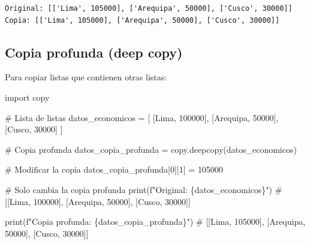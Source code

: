 \documentclass[
  doc,
  floatsintext,
  longtable,
  a4paper,
  nolmodern,
  notxfonts,
  notimes,
  12pt,
  colorlinks=true,linkcolor=blue,citecolor=blue,urlcolor=blue]{apa7}
\newenvironment{Shaded}{\begin{snugshade}}{\end{snugshade}}
\newcommand{\BuiltInTok}[1]{\textcolor[rgb]{0.00,0.23,0.31}{#1}}
\newcommand{\CommentTok}[1]{\textcolor[rgb]{0.37,0.37,0.37}{#1}}
\newcommand{\DecValTok}[1]{\textcolor[rgb]{0.68,0.00,0.00}{#1}}
\newcommand{\ImportTok}[1]{\textcolor[rgb]{0.00,0.46,0.62}{#1}}
\newcommand{\NormalTok}[1]{\textcolor[rgb]{0.00,0.23,0.31}{#1}}
\newcommand{\OperatorTok}[1]{\textcolor[rgb]{0.37,0.37,0.37}{#1}}
\newcommand{\SpecialCharTok}[1]{\textcolor[rgb]{0.37,0.37,0.37}{#1}}
\newcommand{\SpecialStringTok}[1]{\textcolor[rgb]{0.13,0.47,0.30}{#1}}
\newcommand{\StringTok}[1]{\textcolor[rgb]{0.13,0.47,0.30}{#1}}
\begin{document}
\begin{verbatim}
Original: [['Lima', 105000], ['Arequipa', 50000], ['Cusco', 30000]]
Copia: [['Lima', 105000], ['Arequipa', 50000], ['Cusco', 30000]]
\end{verbatim}

\subsection{Copia profunda (deep copy)}\label{copia-profunda-deep-copy}

Para copiar listas que contienen otras listas:

\begin{Shaded}
\begin{Highlighting}[]
\ImportTok{import}\NormalTok{ copy}

\CommentTok{\# Lista de listas}
\NormalTok{datos\_economicos }\OperatorTok{=}\NormalTok{ [}
\NormalTok{    [}\StringTok{\textquotesingle{}Lima\textquotesingle{}}\NormalTok{, }\DecValTok{100000}\NormalTok{],}
\NormalTok{    [}\StringTok{\textquotesingle{}Arequipa\textquotesingle{}}\NormalTok{, }\DecValTok{50000}\NormalTok{],}
\NormalTok{    [}\StringTok{\textquotesingle{}Cusco\textquotesingle{}}\NormalTok{, }\DecValTok{30000}\NormalTok{]}
\NormalTok{]}

\CommentTok{\# Copia profunda}
\NormalTok{datos\_copia\_profunda }\OperatorTok{=}\NormalTok{ copy.deepcopy(datos\_economicos)}

\CommentTok{\# Modificar la copia}
\NormalTok{datos\_copia\_profunda[}\DecValTok{0}\NormalTok{][}\DecValTok{1}\NormalTok{] }\OperatorTok{=} \DecValTok{105000}

\CommentTok{\# Solo cambia la copia profunda}
\BuiltInTok{print}\NormalTok{(}\SpecialStringTok{f"Original: }\SpecialCharTok{\{}\NormalTok{datos\_economicos}\SpecialCharTok{\}}\SpecialStringTok{"}\NormalTok{)}
\CommentTok{\# [[\textquotesingle{}Lima\textquotesingle{}, 100000], [\textquotesingle{}Arequipa\textquotesingle{}, 50000], [\textquotesingle{}Cusco\textquotesingle{}, 30000]]}

\BuiltInTok{print}\NormalTok{(}\SpecialStringTok{f"Copia profunda: }\SpecialCharTok{\{}\NormalTok{datos\_copia\_profunda}\SpecialCharTok{\}}\SpecialStringTok{"}\NormalTok{)}
\CommentTok{\# [[\textquotesingle{}Lima\textquotesingle{}, 105000], [\textquotesingle{}Arequipa\textquotesingle{}, 50000], [\textquotesingle{}Cusco\textquotesingle{}, 30000]]}
\end{Highlighting}
\end{Shaded}
\end{document}
